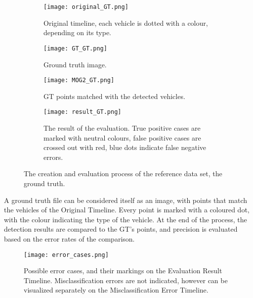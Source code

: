 \begin{figure}[!h]
	\centering
	\begin{subfigure}[!h]{0.87\textwidth}
		\texttt{[image: original\_GT.png]}
		\caption{Original timeline, each vehicle is dotted with a colour, depending on its type.\label{fig:GT_original}}
	\end{subfigure}
	\hfill
	\begin{subfigure}[!h]{0.87\textwidth}
		\texttt{[image: GT\_GT.png]}
		\caption{Ground truth image.\label{fig:GT_GT}}
	\end{subfigure}
	\hfill
	\begin{subfigure}[!h]{0.87\textwidth}
		\texttt{[image: MOG2\_GT.png]}
		\caption{GT points matched with the detected vehicles. \label{fig:GT_MOG}}
	\end{subfigure}
	\hfill
	\begin{subfigure}[!h]{0.87\textwidth}
		\texttt{[image: result\_GT.png]}
		\caption{The result of the evaluation. True positive cases are marked with neutral colours, false positive cases are crossed out with red, blue dots indicate false negative errors.\label{fig:GT_result}}
	\end{subfigure}
	\caption[The creation of the reference data set, the ground truth]{The creation and evaluation process of the reference data set, the ground truth.\label{fig:GT}}
\end{figure}

A ground truth file can be considered itself as an image, with points that match the vehicles of the Original Timeline.
Every point is marked with a coloured dot, with the colour indicating the type of the vehicle.
At the end of the process, the detection results are compared to the GT's  points, and precision is evaluated based on the error rates of the comparison.

\begin{figure}[!h]
	\centering
	\texttt{[image: error\_cases.png]}
	\caption[Possible error cases]{Possible error cases, and their markings on the Evaluation Result Timeline. Misclassification errors are not indicated, however can be visualized separately on the Misclassification Error Timeline.\label{fig:error_cases}}
\end{figure}


